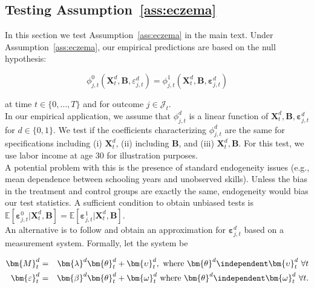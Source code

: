 \subsection{Testing  Assumption~\ref{ass:eczema}} \label{app:invariance}

\noindent In this section we test Assumption~\ref{ass:eczema} in the main text. Under Assumption~\ref{ass:eczema}, our empirical predictions are based on the null hypothesis: 

\begin{equation}
\phi_{j,t}^0 \left( \bm{X}_{t}^d, \bm{B}, \varepsilon_{j,t}^d\right) = \phi_{j,t}^1 \left( \bm{X}_{t}^d, \bm{B}, \bm{\varepsilon}_{j,t}^d\right) \label{eq:eqs}
\end{equation}

\noindent at time $t \in \{0, \ldots, T\}$ and for outcome $j \in \mathcal{J}_{t}$.\\

\noindent In our empirical application, we assume that $\phi_{j,t}^d$ is a linear function of $ \bm{X}_{t}^d, \bm{B}, \bm{\varepsilon}_{j,t}^d$ for $d \in \{0,1\}$. We test if the coefficients characterizing $\phi_{j,t}^d$ are the same for specifications including (i) $\bm{X}_{t}^d$, (ii) including  $\bm{B}$, and (iii) $\bm{X}_{t}^d, \bm{B}$. For this test, we use labor income at age 30 for illustration purposes.\\

\noindent A potential problem with this is the presence of standard endogeneity issues (e.g., mean dependence between schooling years and unobserved skills). Unless the bias in the treatment and control groups are exactly the same, endogeneity would bias our test statistics. A sufficient condition to obtain unbiased tests is $\mathbb{E} \left[ \bm{\varepsilon}_{j,t}^0 | \bm{X}_{t}^d, \bm{B} \right] = \mathbb{E} \left[ \bm{\varepsilon}_{j,t}^1 | \bm{X}_{t}^d, \bm{B} \right]$.\\

\noindent An alternative is to follow \citet{Heckman_Pinto_etal_2013_PerryFactor} and obtain an approximation for  $\bm{\varepsilon}_{j,t}^d$ based on a measurement system. Formally, let the system be 

\begin{eqnarray}
\bm{M}_{t}^d     &=& \bm{\lambda}^d \bm{\theta}_{t}^d +  \bm{\upsilon}_t^d, \text{ where } \bm{\theta}^d  \independent \bm{\upsilon}_{t}^d \ \forall t \\ \nonumber 
\bm{\varepsilon}_{t}^d &=& \bm{\beta}^d \bm{\theta}_{t}^d + \bm{\omega}_{t}^d \text{ where } \bm{\theta}^d  \independent \bm{\omega}_{t}^d \ \forall t. \label{eq:msystem}
\end{eqnarray}

